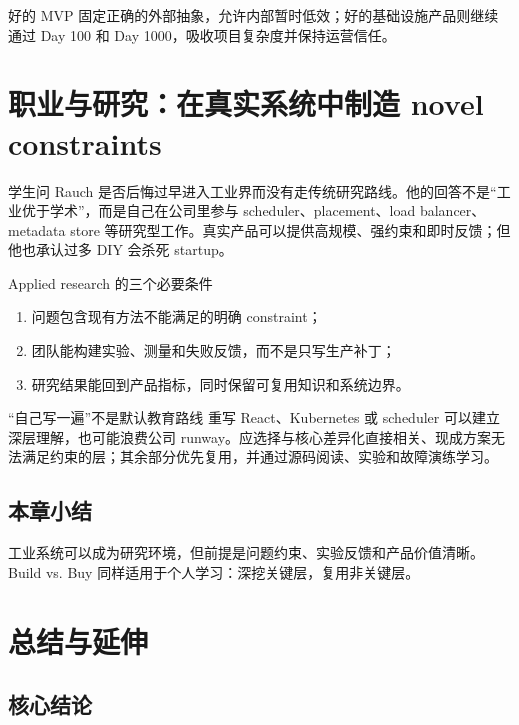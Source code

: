 \documentclass[a4paper]{article}
\begin{document}
好的 MVP 固定正确的外部抽象，允许内部暂时低效；好的基础设施产品则继续通过 Day 100 和 Day 1000，吸收项目复杂度并保持运营信任。

\section{职业与研究：在真实系统中制造 novel constraints}

学生问 Rauch 是否后悔过早进入工业界而没有走传统研究路线。他的回答不是“工业优于学术”，而是自己在公司里参与 scheduler、placement、load balancer、metadata store 等研究型工作。真实产品可以提供高规模、强约束和即时反馈；但他也承认过多 DIY 会杀死 startup。

\begin{knowledgebox}{Applied research 的三个必要条件}
\begin{enumerate}
  \item 问题包含现有方法不能满足的明确 constraint；
  \item 团队能构建实验、测量和失败反馈，而不是只写生产补丁；
  \item 研究结果能回到产品指标，同时保留可复用知识和系统边界。
\end{enumerate}
\end{knowledgebox}

\begin{warningbox}{“自己写一遍”不是默认教育路线}
重写 React、Kubernetes 或 scheduler 可以建立深层理解，也可能浪费公司 runway。应选择与核心差异化直接相关、现成方案无法满足约束的层；其余部分优先复用，并通过源码阅读、实验和故障演练学习。
\end{warningbox}


\subsection{本章小结}

工业系统可以成为研究环境，但前提是问题约束、实验反馈和产品价值清晰。Build vs. Buy 同样适用于个人学习：深挖关键层，复用非关键层。

\section{总结与延伸}

\subsection{核心结论}
\end{document}
